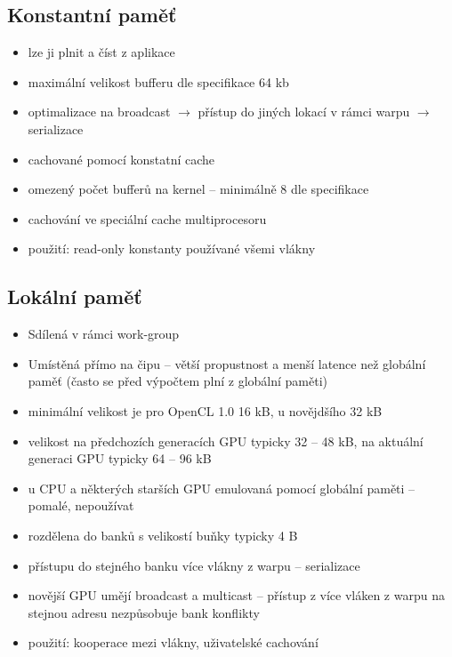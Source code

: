 	\subsection*{Konstantní paměť}
		\label{subsec:konstantni_pamet}
		\begin{itemize}
			\setlength\itemsep{0em}
			\item lze ji plnit a číst z aplikace
			\item maximální velikost bufferu dle specifikace 64 kb
			\item optimalizace na broadcast $\rightarrow$ přístup do jiných lokací v rámci warpu $\rightarrow$ serializace
			\item cachované pomocí konstatní cache
			\item omezený počet bufferů na kernel -- minimálně 8 dle specifikace
			\item cachování ve speciální cache multiprocesoru
			\item použití: read-only konstanty používané všemi vlákny
		\end{itemize}

	\subsection*{Lokální paměť}
		\label{subsec:lokalni_pamet}
		\begin{itemize}
			\setlength\itemsep{0em}
			\item Sdílená v rámci work-group
			\item Umístěná přímo na čipu -- větší propustnost a menší latence než globální paměť (často se před výpočtem plní z globální paměti)
			\item minimální velikost je pro OpenCL 1.0 16 kB, u novějdšího 32 kB
			\item velikost na předchozích generacích GPU typicky 32 -- 48 kB, na aktuální generaci GPU typicky 64 -- 96 kB
			\item u CPU a některých starších GPU emulovaná pomocí globální paměti -- pomalé, nepoužívat
			\item rozdělena do banků s velikostí buňky typicky 4 B
			\item přístupu do stejného banku více vlákny z warpu -- serializace
			\item novější GPU umějí broadcast a multicast -- přístup z více vláken z warpu na stejnou adresu nezpůsobuje bank konflikty
			\item použití: kooperace mezi vlákny, uživatelské cachování
		\end{itemize}
	
